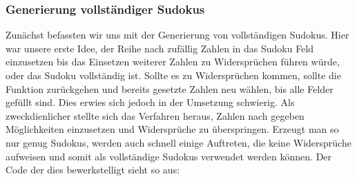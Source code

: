 \documentclass[11pt,a4paper]{article}
\begin{document}
\subsubsection{Generierung vollständiger Sudokus}
Zunächst befassten wir uns mit der Generierung von vollständigen Sudokus.
Hier war unsere erste Idee, der Reihe nach zufällig Zahlen in das Sudoku Feld einzusetzen bis das Einsetzen weiterer Zahlen zu Widersprüchen führen würde, oder das Sudoku vollständig ist. Sollte es zu Widersprüchen kommen, sollte die Funktion zurückgehen und bereits gesetzte Zahlen neu wählen, bis alle Felder gefüllt sind. Dies erwies sich jedoch in der Umsetzung schwierig. Als zweckdienlicher stellte sich das Verfahren heraus, Zahlen nach gegeben Möglichkeiten einzusetzen und Widersprüche zu überspringen. Erzeugt man so nur genug Sudokus, werden auch schnell einige Auftreten, die keine Widersprüche aufweisen und somit als vollständige Sudokus verwendet werden können. Der Code der dies bewerkstelligt sieht so aus:
\\
\end{document}

